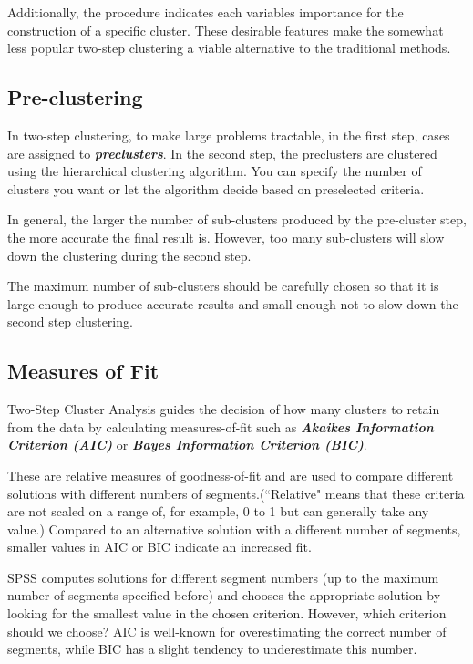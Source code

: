 \documentclass[a4paper,12pt]{report}
\begin{document}
Additionally, the procedure indicates each variables
importance for the construction of a specific cluster. These desirable features make
the somewhat less popular two-step clustering a viable alternative to the traditional
methods.


\subsection{Pre-clustering }

In two-step clustering, to make large problems tractable, in the first step, cases are
assigned to \textbf{\textit{preclusters}}. In the second step, the preclusters are clustered using the
hierarchical clustering algorithm. You can specify the number of clusters you want or
let the algorithm decide based on preselected criteria.

In general, the larger the number of sub-clusters produced by the pre-cluster step, the more accurate the final result is. However, too many sub-clusters will slow down the clustering during the second step.

The maximum number of sub-clusters should be carefully chosen so that it is large enough to produce accurate results and small enough not to slow down the second step clustering.






\subsection{Measures of Fit}
Two-Step Cluster Analysis guides the decision of how many clusters to retain from the data by
calculating measures-of-fit such as \textbf{\textit{Akaikes Information Criterion (AIC)}} or \textbf{\textit{Bayes Information Criterion (BIC)}}.

These are relative measures of goodness-of-fit and are used to compare different
solutions with different numbers of segments.(``Relative" means that these criteria
are not scaled on a range of, for example, 0 to 1 but can generally take any value.)
Compared to an alternative solution with a different number of segments, smaller
values in AIC or BIC indicate an increased fit.

SPSS computes solutions for different
segment numbers (up to the maximum number of segments specified before) and
chooses the appropriate solution by looking for the smallest value in the chosen
criterion. However, which criterion should we choose? AIC is well-known for
overestimating the correct number of segments, while BIC has a slight tendency
to underestimate this number.
\end{document}
